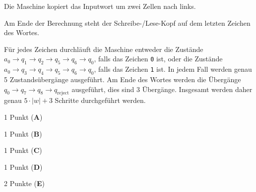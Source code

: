 \begin{loesung}
\begin{teilaufgaben}
\item
Die Maschine kopiert das Inputwort um zwei Zellen nach links.
\item
Am Ende der Berechnung steht der Schreibe-/Lese-Kopf auf dem letzten Zeichen
des Wortes.
\item
Für jedes Zeichen durchläuft die Maschine entweder die Zustände
$a_0\to q_1\to q_2\to q_5\to q_6\to q_0$, falls das Zeichen \texttt{0} ist,
oder die Zustände
$a_0\to q_3\to q_4\to q_5\to q_6\to q_0$, falls das Zeichen \texttt{1} ist.
In jedem Fall werden genau 5 Zustandsübergänge ausgeführt.
Am Ende des Wortes werden die Übergänge 
$q_0\to q_7\to q_8\to q_{\text{reject}}$ ausgeführt, dies sind 3 Übergänge.
Insgesamt werden daher genau $5\cdot|w|+3$ Schritte durchgeführt werden.
\qedhere
\end{teilaufgaben}
\end{loesung}

\begin{bewertung}
\begin{teilaufgaben}
\item 1 Punkt ({\bf A})
\item 1 Punkt ({\bf B})
\item 1 Punkt ({\bf C})
\item 1 Punkt ({\bf D})
\item 2 Punkte ({\bf E})
\end{teilaufgaben}
\end{bewertung}

